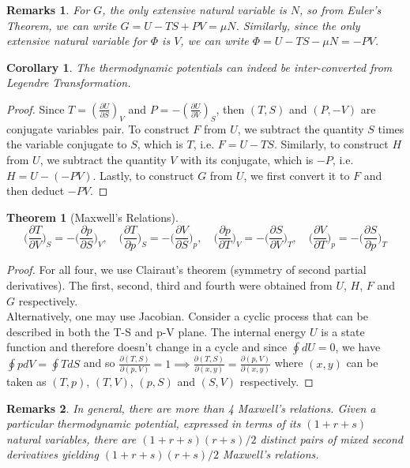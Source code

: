 \documentclass[a4paper]{article}
\newtheorem{remarks}{Remarks}[section]
\theoremstyle{new}
\newtheorem{thm}{Theorem}[section]
\newtheorem{cor}{Corollary}[section]
\begin{document}
\begin{remarks}
For $G$, the only extensive natural variable is $N$, so from Euler's Theorem, we can write $G=U-TS+PV=\mu N$. Similarly, since the only extensive natural variable for $\Phi$ is $V$, we can write $\Phi=U-TS-\mu N=-PV$.
\end{remarks}
\begin{cor}
The thermodynamic potentials can indeed be inter-converted from Legendre Transformation.
\end{cor}
\begin{proof}
Since $T=(\frac{\partial U}{\partial S})_V$ and $P=-(\frac{\partial U}{\partial V})_S$, then $(T,S)$ and $(P,-V)$ are conjugate variables pair. To construct $F$ from $U$, we subtract the quantity $S$ times the variable conjugate to $S$, which is $T$, i.e. $F=U-TS$. Similarly, to construct $H$ from $U$, we subtract the quantity $V$ with its conjugate, which is $-P$, i.e. $H=U-(-PV)$. Lastly, to construct $G$ from $U$, we first convert it to $F$ and then deduct $-PV$. 
\end{proof}
\begin{thm}[Maxwell's Relations]
$$\bigg(\frac{\partial T}{\partial V}\bigg)_S=-\bigg(\frac{\partial p}{\partial S}\bigg)_V,\quad\bigg(\frac{\partial T}{\partial p}\bigg)_S=-\bigg(\frac{\partial V}{\partial S}\bigg)_p,\quad\bigg(\frac{\partial p}{\partial T}\bigg)_V=-\bigg(\frac{\partial S}{\partial V}\bigg)_T,\quad\bigg(\frac{\partial V}{\partial T}\bigg)_p=-\bigg(\frac{\partial S}{\partial p}\bigg)_T$$
\end{thm}
\begin{proof}
For all four, we use Clairaut's theorem (symmetry of second partial derivatives). The first, second, third and fourth were obtained from $U$, $H$, $F$ and $G$ respectively.\\[5pt]
Alternatively, one may use Jacobian. Consider a cyclic process that can be described in both the T-S and p-V plane. The internal energy $U$ is a state function and therefore doesn't change in a cycle and since $\oint dU=0$, we have $\oint pdV=\oint TdS$ and so $\frac{\partial(T,S)}{\partial(p,V)}=1\implies\frac{\partial(T,S)}{\partial(x,y)}=\frac{\partial(p,V)}{\partial(x,y)}$ where $(x,y)$ can be taken as $(T,p)$, $(T,V)$, $(p,S)$ and $(S,V)$ respectively.
\end{proof}
\begin{remarks}
In general, there are more than 4 Maxwell's relations. Given a particular thermodynamic potential, expressed in terms of its $(1+r+s)$ natural variables, there are $(1+r+s)(r+s)/2$ distinct pairs of mixed second derivatives yielding $(1 + r + s)(r + s)/2$ Maxwell’s relations.
\end{remarks}
\end{document}
